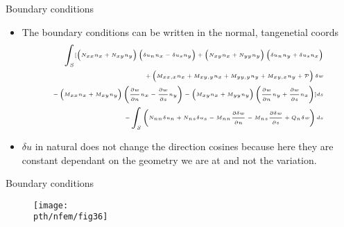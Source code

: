 	\begin{frame}{Boundary conditions}
		\begin{itemize}
			\item The boundary conditions can be written in the normal, tangenetial coords 
			\begin{equation}
			\tiny
			\begin{aligned}
			\int_S [ 
			\left(N_{xx}n_x + N_{xy}n_y\right)\left(\delta u_nn_x - \delta u_sn_y\right) +
			\left(N_{xy}n_x + N_{yy}n_y\right)\left(\delta u_nn_y + \delta u_sn_x\right) \\ +
			\left( M_{xx,x}n_x + M_{xy,y}n_x + M_{yy,y}n_y + M_{xy,x}n_y + \mathcal{P} \right) \delta w \\ - 
			\left(M_{xx}n_x + M_{xy}n_y \right)\left(\frac{\partial w}{\partial n} n_x 
			- \frac{\partial w}{\partial s}n_y \right) - 
			\left(M_{xy}n_x + M_{yy}n_y \right)\left(\frac{\partial w}{\partial n} n_y 
			+ \frac{\partial w}{\partial s}n_x \right)]ds\\
			 - \int_S \left(N_{nn} \delta u_n + N_{ns}\delta u_s - M_{nn}\frac{\partial \delta w}{\partial n} - M_{ns}\frac{\partial \delta w}{\partial s} + Q_n \delta w \right)ds
			\end{aligned} 
			\end{equation}
			\item $\delta u$ in natural does not change the direction cosines because here they are constant dependant on the geometry we are at and not the variation.
		\end{itemize}
	\end{frame}


	\begin{frame}{Boundary conditions}
		\begin{figure}
			\centering
			\texttt{[image: \\pth/nfem/fig36]} 		
		\end{figure}
	\end{frame}